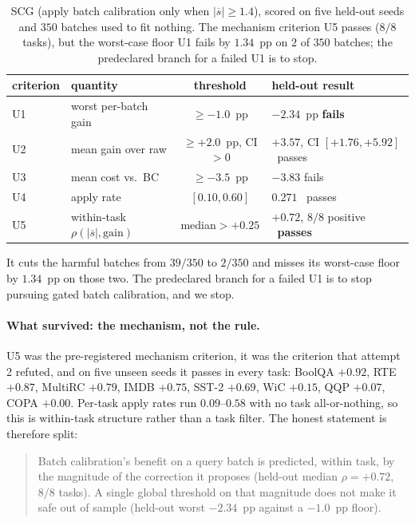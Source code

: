 \begin{table}[t]
\centering
\small
\caption{SCG (apply batch calibration only when $|\overline{s}|\ge1.4$), scored on
five held-out seeds and $350$ batches used to fit nothing. The mechanism criterion
U5 passes ($8/8$ tasks), but the worst-case floor U1 fails by $1.34$~pp on $2$ of
$350$ batches; the predeclared branch for a failed U1 is to stop.}
\label{tab:scg}
\begin{tabular}{llcl}
\toprule
criterion & quantity & threshold & held-out result \\
\midrule
U1 & worst per-batch gain & $\ge-1.0$~pp & $\mathbf{-2.34}$~pp \quad\textbf{fails} \\
U2 & mean gain over raw & $\ge+2.0$~pp, CI${}>0$ & $+3.57$, CI $[+1.76,+5.92]$ \ passes \\
U3 & mean cost vs.\ BC & $\ge-3.5$~pp & $-3.83$ \quad fails \\
U4 & apply rate & $[0.10,0.60]$ & $0.271$ \ passes \\
U5 & within-task $\rho(|\overline{s}|,\text{gain})$ & median${}>{+}0.25$ & $\mathbf{+0.72}$, $8/8$ positive \ \textbf{passes} \\
\bottomrule
\end{tabular}
\end{table}

\noindent It cuts the harmful batches from $39/350$ to $2/350$ and misses its
worst-case floor by $1.34$~pp on those two. The predeclared branch for a failed U1 is
to stop pursuing gated batch calibration, and we stop.

\paragraph{What survived: the mechanism, not the rule.}
U5 was the pre-registered mechanism criterion, it was the criterion that attempt 2
refuted, and on five unseen seeds it passes in every task: BoolQA $+0.92$, RTE
$+0.87$, MultiRC $+0.79$, IMDB $+0.75$, SST-2 $+0.69$, WiC $+0.15$, QQP $+0.07$,
COPA $+0.00$. Per-task apply rates run $0.09$--$0.58$ with no task all-or-nothing, so
this is within-task structure rather than a task filter. The honest statement is
therefore split:

\begin{quote}
Batch calibration's benefit on a query batch is predicted, within task, by the
magnitude of the correction it proposes (held-out median $\rho=+0.72$, $8/8$ tasks).
A single global threshold on that magnitude does not make it safe out of sample
(held-out worst $-2.34$~pp against a $-1.0$~pp floor).
\end{quote}

